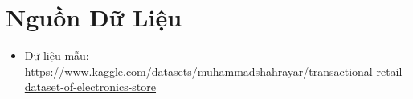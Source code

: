 \section{Nguồn Dữ Liệu}
\begin{itemize}
    \item Dữ liệu mẫu: \href{https://www.kaggle.com/datasets/muhammadshahrayar/transactional-retail-dataset-of-electronics-store}{https://www.kaggle.com/datasets/muhammadshahrayar/transactional-retail-dataset-of-electronics-store}

\end{itemize}
